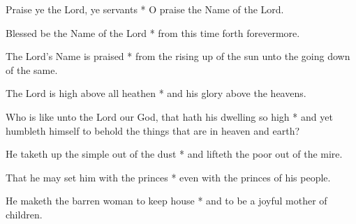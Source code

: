 \begin{multicols}{2}
	
	Praise ye the Lord, ye servants * O praise the Name of the Lord.
	
	Blessed be the Name of the Lord * from this time forth forevermore.
	
	The Lord's Name is praised * from the rising up of the sun unto the going down of the same.
	
	The Lord is high above all heathen * and his glory above the heavens.
	
	Who is like unto the Lord our God, that hath his dwelling so high * and yet humbleth himself to behold the things that are in heaven and earth?
	
	He taketh up the simple out of the dust * and lifteth the poor out of the mire.
	
	That he may set him with the princes * even with the princes of his people.
	
	He maketh the barren woman to keep house * and to be a joyful mother of children.
	
	\gloria{}
\end{multicols}